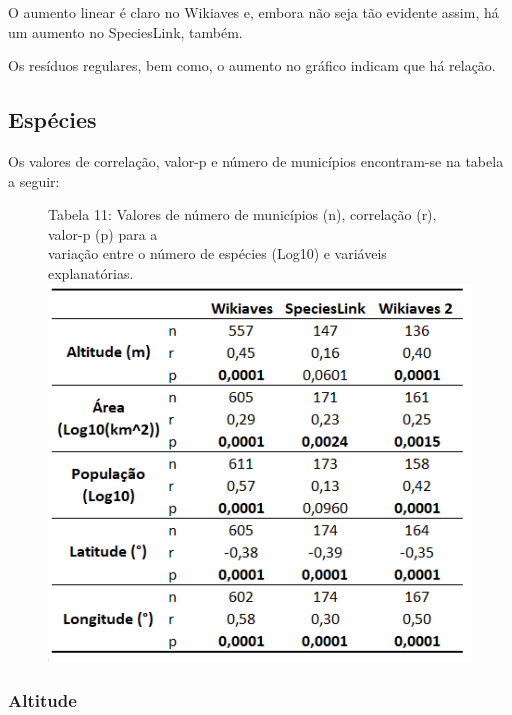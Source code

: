 \documentclass[12pt]{extarticle}
\newenvironment{resposta}{ \color{mygray}}{}
\begin{document}
 \begin{resposta}
O aumento linear é claro no Wikiaves e, embora não seja tão evidente assim, há um aumento no SpeciesLink, também.

Os resíduos regulares, bem como, o aumento no gráfico indicam que há relação.
\end{resposta}


\subsection{Espécies}

\begin{resposta}
Os valores de correlação, valor-p e número de municípios encontram-se na tabela a seguir:
\end{resposta}

\newpage

\begin{figure}[h!]
\centering
{\scriptsize Tabela 11: Valores de número de municípios (n), correlação (r), valor-p (p) para a\\ variação entre o número de espécies (Log10) e variáveis explanatórias.}
\includegraphics{Imagens/T11.png}
\end{figure}

\subsubsection{Altitude}


 
\end{document}
